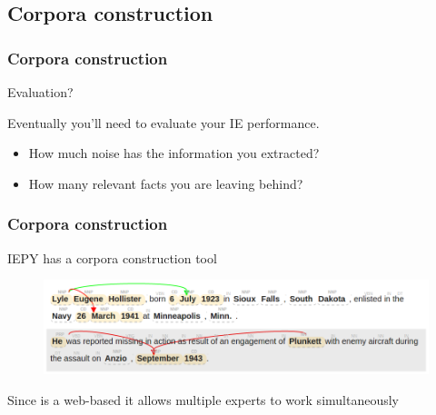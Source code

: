\documentclass{beamer}
\begin{document}
\subsection{Corpora construction}

\begin{frame}
\frametitle{Corpora construction}

\begin{block}{Evaluation?}
\vspace{15pt}
\centerline{Eventually you'll need to evaluate your IE performance.}
\vspace{15pt}
\pause

\begin{itemize}
  \item How much noise has the information you extracted?
  \item How many relevant facts you are leaving behind?
\end{itemize}

\end{block}


\end{frame}

\begin{frame}
\frametitle{Corpora construction}

IEPY has a corpora construction tool

\begin{figure}
\includegraphics[width=1\linewidth]{corpora2}
\end{figure}

Since is a web-based it allows multiple experts to work simultaneously

\end{frame}
\end{document}
